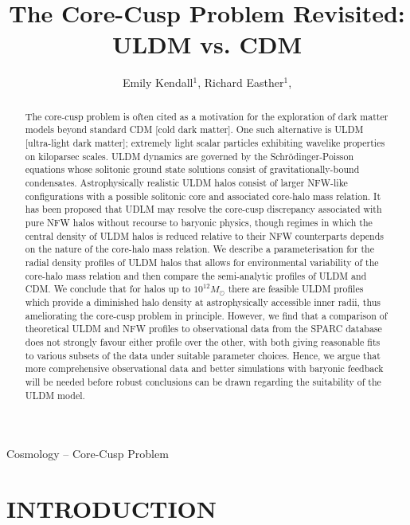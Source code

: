 \documentclass{pasa}%
\title[The Core-Cusp Problem Revisited: ULDM vs. CDM]{The Core-Cusp Problem Revisited: ULDM vs. CDM}
\author[Emily Kendall and Richard Easther]{Emily Kendall$^1$, Richard Easther$^1$, \affil{$^1$Department of Physics, University of Auckland, Private Bag 92019, Auckland, New Zealand}}%
\begin{document}
\begin{frontmatter}
\maketitle

\begin{abstract}
The core-cusp problem is often cited as a motivation for the exploration of dark matter models beyond standard CDM [cold dark matter]. One such alternative is ULDM [ultra-light dark matter]; extremely light scalar particles exhibiting wavelike properties on kiloparsec scales. ULDM dynamics are governed by the Schr\"{o}dinger-Poisson equations whose solitonic ground state solutions consist of gravitationally-bound condensates. Astrophysically realistic ULDM halos consist of larger NFW-like configurations with a possible solitonic core and associated core-halo mass relation. It has been proposed that UDLM may resolve the core-cusp discrepancy associated with pure NFW halos without recourse to baryonic physics, though regimes in which the central density of ULDM halos is reduced relative to their NFW counterparts depends on the nature of the core-halo mass relation. We describe a parameterisation for the radial density profiles of ULDM halos that allows for environmental variability of the core-halo mass relation and then compare the semi-analytic profiles of ULDM and CDM. We conclude that for halos up to $10^{12} M_\odot$ there are feasible ULDM profiles which provide a diminished halo density at astrophysically accessible inner radii, thus ameliorating the core-cusp problem in principle. However, we find that a comparison of theoretical ULDM and NFW profiles to observational data from the SPARC database does not strongly favour either profile over the other, with both giving reasonable fits to various subsets of the data under suitable parameter choices. Hence, we argue that more comprehensive observational data and better simulations with baryonic feedback will be needed before robust conclusions can be drawn regarding the suitability of the ULDM model.

\end{abstract}

\begin{keywords}
Cosmology -- Core-Cusp Problem 
\end{keywords}
\end{frontmatter}


\section{INTRODUCTION }
\label{sec:intro}
\end{document}
